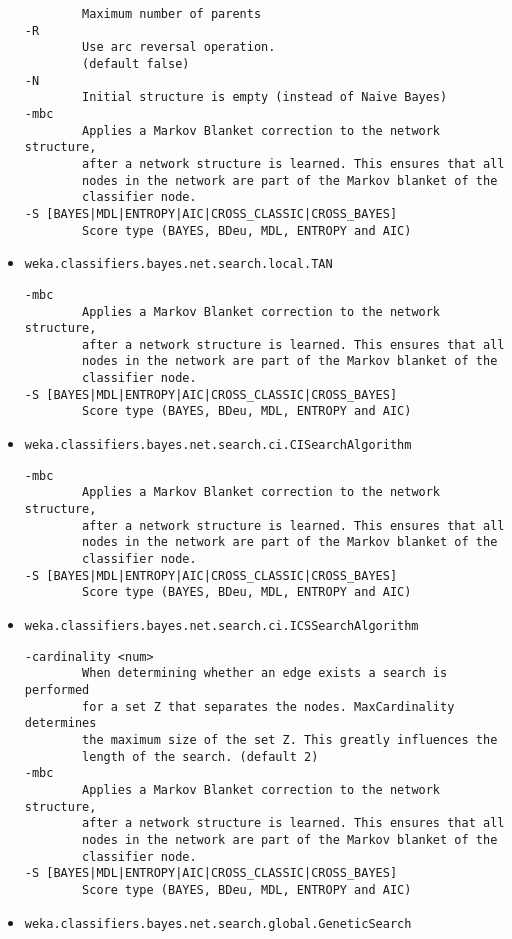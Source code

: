 \documentclass[a4paper]{article}
\begin{document}
\begin{itemize}
\begin{verbatim}
        Maximum number of parents
-R
        Use arc reversal operation.
        (default false)
-N
        Initial structure is empty (instead of Naive Bayes)
-mbc
        Applies a Markov Blanket correction to the network structure,
        after a network structure is learned. This ensures that all
        nodes in the network are part of the Markov blanket of the
        classifier node.
-S [BAYES|MDL|ENTROPY|AIC|CROSS_CLASSIC|CROSS_BAYES]
        Score type (BAYES, BDeu, MDL, ENTROPY and AIC)
  \end{verbatim}
\item \texttt{weka.classifiers.bayes.net.search.local.TAN}
  \begin{verbatim}
-mbc
        Applies a Markov Blanket correction to the network structure,
        after a network structure is learned. This ensures that all
        nodes in the network are part of the Markov blanket of the
        classifier node.
-S [BAYES|MDL|ENTROPY|AIC|CROSS_CLASSIC|CROSS_BAYES]
        Score type (BAYES, BDeu, MDL, ENTROPY and AIC)
  \end{verbatim}
\item \texttt{weka.classifiers.bayes.net.search.ci.CISearchAlgorithm}
  \begin{verbatim}
-mbc
        Applies a Markov Blanket correction to the network structure,
        after a network structure is learned. This ensures that all
        nodes in the network are part of the Markov blanket of the
        classifier node.
-S [BAYES|MDL|ENTROPY|AIC|CROSS_CLASSIC|CROSS_BAYES]
        Score type (BAYES, BDeu, MDL, ENTROPY and AIC)
  \end{verbatim}
\item \texttt{weka.classifiers.bayes.net.search.ci.ICSSearchAlgorithm}
  \begin{verbatim}
-cardinality <num>
        When determining whether an edge exists a search is performed
        for a set Z that separates the nodes. MaxCardinality determines
        the maximum size of the set Z. This greatly influences the
        length of the search. (default 2)
-mbc
        Applies a Markov Blanket correction to the network structure,
        after a network structure is learned. This ensures that all
        nodes in the network are part of the Markov blanket of the
        classifier node.
-S [BAYES|MDL|ENTROPY|AIC|CROSS_CLASSIC|CROSS_BAYES]
        Score type (BAYES, BDeu, MDL, ENTROPY and AIC)
  \end{verbatim}
\item \texttt{weka.classifiers.bayes.net.search.global.GeneticSearch}

\end{itemize}
\end{document}
